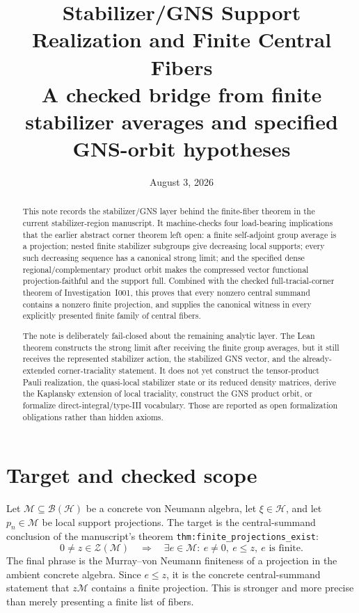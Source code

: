 \documentclass[11pt,reqno]{amsart}
\title[Stabilizer/GNS Support Realization]{Stabilizer/GNS Support Realization and Finite Central Fibers\\
\large A checked bridge from finite stabilizer averages and specified GNS-orbit hypotheses}
\author{}
\date{August 3, 2026}
\numberwithin{equation}{section}
\theoremstyle{definition}
\theoremstyle{remark}
\newcommand{\cB}{\mathcal B}
\newcommand{\cH}{\mathcal H}
\newcommand{\cM}{\mathcal M}
\newcommand{\cZ}{\mathcal Z}
\begin{document}
\begin{abstract}
This note records the stabilizer/GNS layer behind the finite-fiber theorem in
the current stabilizer-region manuscript.  It machine-checks four load-bearing
implications that the earlier abstract corner theorem left open: a finite
self-adjoint group average is a projection; nested finite stabilizer subgroups
give decreasing local supports; every such decreasing sequence has a canonical
strong limit; and the specified dense regional/complementary product orbit
makes the compressed vector functional projection-faithful and the support
full.  Combined with the checked full-tracial-corner theorem of
Investigation~I001, this proves that every nonzero central summand contains a
nonzero finite projection, and supplies the canonical witness in every
explicitly presented finite family of central fibers.

The note is deliberately fail-closed about the remaining analytic layer.  The
Lean theorem constructs the strong limit after receiving the finite group
averages, but it still receives the represented stabilizer action, the
stabilized GNS vector, and the already-extended corner-traciality statement.
It does not yet construct the tensor-product Pauli realization, the
quasi-local stabilizer state or its reduced density matrices, derive the
Kaplansky extension of local traciality, construct the GNS product orbit, or
formalize direct-integral/type-III vocabulary.  Those are
reported as open formalization obligations rather than hidden axioms.
\end{abstract}

\maketitle

\section{Target and checked scope}
\label{sec:target}

Let $\cM\subseteq\cB(\cH)$ be a concrete von Neumann algebra, let
$\xi\in\cH$, and let $p_n\in\cM$ be local support projections.  The target
is the central-summand conclusion of the manuscript's theorem
\texttt{thm:finite\_projections\_exist}:
\begin{equation}
  0\neq z\in\cZ(\cM)
  \quad\Longrightarrow\quad
  \exists e\in\cM:\ e\neq0,\ e\leq z,\ e\text{ is finite}.
  \label{eq:central_summand_goal}
\end{equation}
The final phrase is the Murray--von Neumann finiteness of a projection in the
ambient concrete algebra.  Since $e\leq z$, it is the concrete
central-summand statement that $z\cM$ contains a finite projection.  This is
stronger and more precise than merely presenting a finite list of fibers.
\end{document}
